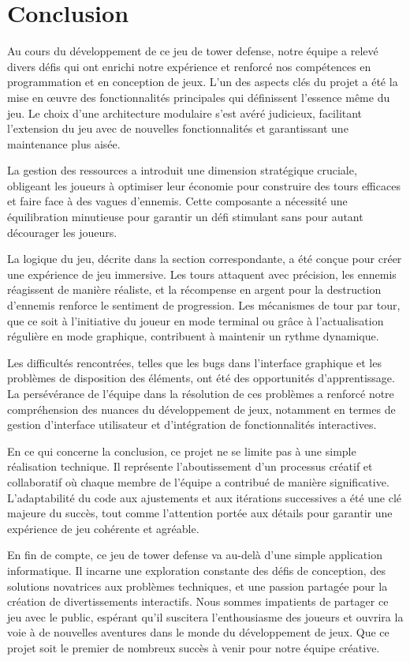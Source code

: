 \documentclass{article}
\begin{document}
\newpage
\section{Conclusion}
Au cours du développement de ce jeu de tower defense, notre équipe a relevé divers défis qui ont enrichi notre expérience et renforcé nos compétences en programmation et en conception de jeux. L'un des aspects clés du projet a été la mise en œuvre des fonctionnalités principales qui définissent l'essence même du jeu. Le choix d'une architecture modulaire s'est avéré judicieux, facilitant l'extension du jeu avec de nouvelles fonctionnalités et garantissant une maintenance plus aisée.

La gestion des ressources a introduit une dimension stratégique cruciale, obligeant les joueurs à optimiser leur économie pour construire des tours efficaces et faire face à des vagues d'ennemis. Cette composante a nécessité une équilibration minutieuse pour garantir un défi stimulant sans pour autant décourager les joueurs.

La logique du jeu, décrite dans la section correspondante, a été conçue pour créer une expérience de jeu immersive. Les tours attaquent avec précision, les ennemis réagissent de manière réaliste, et la récompense en argent pour la destruction d'ennemis renforce le sentiment de progression. Les mécanismes de tour par tour, que ce soit à l'initiative du joueur en mode terminal ou grâce à l'actualisation régulière en mode graphique, contribuent à maintenir un rythme dynamique.

Les difficultés rencontrées, telles que les bugs dans l'interface graphique et les problèmes de disposition des éléments, ont été des opportunités d'apprentissage. La persévérance de l'équipe dans la résolution de ces problèmes a renforcé notre compréhension des nuances du développement de jeux, notamment en termes de gestion d'interface utilisateur et d'intégration de fonctionnalités interactives.

En ce qui concerne la conclusion, ce projet ne se limite pas à une simple réalisation technique. Il représente l'aboutissement d'un processus créatif et collaboratif où chaque membre de l'équipe a contribué de manière significative. L'adaptabilité du code aux ajustements et aux itérations successives a été une clé majeure du succès, tout comme l'attention portée aux détails pour garantir une expérience de jeu cohérente et agréable.

En fin de compte, ce jeu de tower defense va au-delà d'une simple application informatique. Il incarne une exploration constante des défis de conception, des solutions novatrices aux problèmes techniques, et une passion partagée pour la création de divertissements interactifs. Nous sommes impatients de partager ce jeu avec le public, espérant qu'il suscitera l'enthousiasme des joueurs et ouvrira la voie à de nouvelles aventures dans le monde du développement de jeux. Que ce projet soit le premier de nombreux succès à venir pour notre équipe créative.
\end{document}
